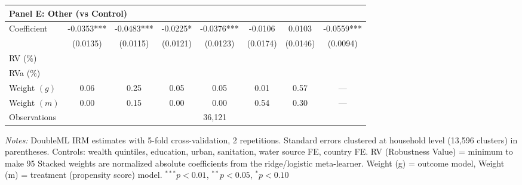 \begin{table}[htbp]
\begin{tabular}{lccccccc}
\multicolumn{8}{l}{\textbf{Panel E: Other (vs Control)}} \\
\midrule
Coefficient & -0.0353*** & -0.0483*** & -0.0225* & -0.0376*** & -0.0106 & 0.0103 & -0.0559*** \\
 & (0.0135) & (0.0115) & (0.0121) & (0.0123) & (0.0174) & (0.0146) & (0.0094) \\
RV (\%) \\
RVa (\%) \\
Weight $(g)$ & 0.06 & 0.25 & 0.05 & 0.05 & 0.01 & 0.57 & — \\
Weight $(m)$ & 0.00 & 0.15 & 0.00 & 0.00 & 0.54 & 0.30 & — \\

\midrule
Observations & \multicolumn{7}{c}{36,121} \\
\bottomrule
\end{tabular}
\begin{minipage}{\textwidth}
\footnotesize
\textit{Notes:} DoubleML IRM estimates with 5-fold cross-validation, 2 repetitions. 
Standard errors clustered at household level (13,596 clusters) in parentheses. 
Controls: wealth quintiles, education, urban, sanitation, water source FE, country FE. 
RV (Robustness Value) = minimum %
to make 95%
Stacked weights are normalized absolute coefficients from the ridge/logistic meta-learner. 
Weight (g) = outcome model, Weight (m) = treatment (propensity score) model. 
$^{***}p<0.01$, $^{**}p<0.05$, $^{*}p<0.10$
\end{minipage}
\end{table}